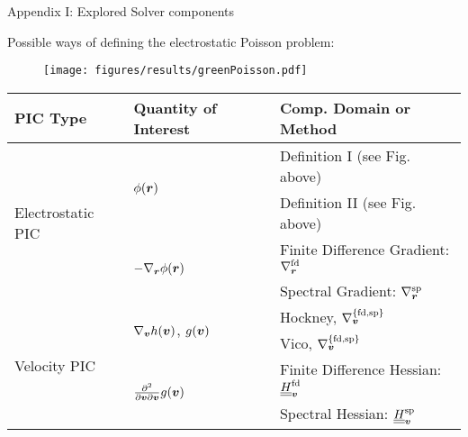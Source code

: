 \begin{frame}{Appendix I: Explored Solver components}
\item Possible ways of defining the electrostatic Poisson problem:
    \begin{figure}
        \begin{center}
            \texttt{[image: figures/results/greenPoisson.pdf]}
        \end{center}
        \label{fig:greenPoissonDefinitions}
    \end{figure}

    \begin{table}[h]
        \renewcommand*\arraystretch{1.5}
        \centering
        \label{table:langevinPossibleMethods}
        \begin{tabular}{|l|l|l|}
            \hline
            \textbf{PIC Type}                           & \textbf{Quantity of Interest}
                                                              & \textbf{Comp. Domain or Method}     \\ \hline
            \multirow{4}{*}{Electrostatic PIC} & \multirow{2}{*}{$\phi(\boldsymbol{r})$}
                                                     & Definition I (see Fig. above)  \\ \cline{3-3} 
                                                     &
                                                     & Definition II (see Fig. above)  \\ \cline{2-3} 
                                                     & \multirow{2}{*}{$- \nabla_{\boldsymbol{r}} \phi(\boldsymbol{r})$}
                                                     & Finite Difference Gradient: $\nabla_{\boldsymbol{r}}^{\text{fd}}$ \\ \cline{3-3} 
                                                     &
                                                     & Spectral Gradient: $\nabla_{\boldsymbol{r}}^{\text{sp}}$          \\ \hline
            \multirow{4}{*}{Velocity PIC}      & \multirow{2}{*}{$\nabla_{\boldsymbol{v}} h(\boldsymbol{v})$, $g(\boldsymbol{v})$}
                                                     & Hockney, $ \nabla_{\boldsymbol{v}}^{\{\text{fd,sp}\}} $                      \\ \cline{3-3} 
                                                     &
                                                     & Vico, $ \nabla_{\boldsymbol{v}}^{\{\text{fd,sp}\}} $                      \\ \cline{2-3} 
                                                     & \multirow{2}{*}{$\frac{\partial^2}{\partial \boldsymbol{v} \partial
    \boldsymbol{v}} g(\boldsymbol{v})$} & Finite Difference Hessian: $\underline{\underline{H}}_{\boldsymbol{v}}^{\text{fd}}$ \\ \cline{3-3} 
                          &
                          & Spectral Hessian: $\underline{\underline{H}}_{\boldsymbol{v}}^{\text{sp}}$           \\
                          \hline
\end{tabular}
\end{table}
\end{frame}

